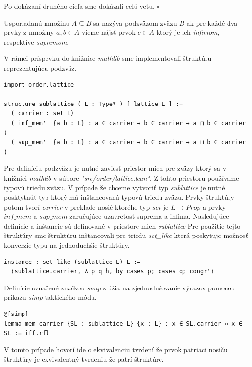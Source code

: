 \documentclass[a4paper,10pt,oneside]{report}%
\begin{document}
    Po dokázaní druhého cieľa sme dokázali celú vetu. $\square$

    Usporiadanú množinu $A \subseteq B$ sa nazýva podzväzom zväzu $B$ ak pre každé
dva prvky z množiny $a, b \in A$ vieme nájsť prvok $c \in A$ ktorý je ich \emph{infimom},
respektíve \emph{supremom}.

    V rámci príspevku do knižnice \emph{mathlib} sme implementovali štruktúru
reprezentujúcu podzväz.
\begin{lstlisting}
import order.lattice

structure sublattice ( L : Type* ) [ lattice L ] :=
  ( carrier : set L)
  ( inf_mem'  {a b : L} : a ∈ carrier → b ∈ carrier → a ⊓ b ∈ carrier )
  ( sup_mem'  {a b : L} : a ∈ carrier → b ∈ carrier → a ⊔ b ∈ carrier )
\end{lstlisting}
    Pre definíciu podzväzu je nutné zaviesť priestor mien pre zväzy ktorý sa v knižnici
\emph{mathlib} v súbore \emph{"src/order/lattice.lean"}.
    Z tohto priestoru používame typovú triedu zväzu.
    V prípade že chceme vytvoriť typ \emph{sublattice} je nutné posktytnúť
typ ktorý má inštancovanú typovú triedu zväzu.
    Prvky štruktúry potom tvorí \emph{carrier} v preklade nosič ktorého typ
$set$ je $L \to Prop$ a prvky $inf\_mem$ a $sup\_mem$ zaručujúce uzavretosť
    suprema a infima.
    Nasledujúce definície a inštancie sú definované v priestore mien \emph{sublattice}
    Pre použitie tejto štruktúry sme štruktúru inštancovali pre triedu \emph{set\_like}
ktorá poskytuje možnosť konverzie typu na jednoduchšie štruktúry.
\begin{lstlisting}
instance : set_like (sublattice L) L :=
  ⟨sublattice.carrier, λ p q h, by cases p; cases q; congr'⟩
\end{lstlisting}
    Definície označené značkou \emph{simp} slúžia na zjednodušovanie výrazov
pomocou príkazu \emph{simp} taktického módu.
\begin{lstlisting}
@[simp]
lemma mem_carrier {SL : sublattice L} {x : L} : x ∈ SL.carrier ↔ x ∈ SL := iff.rfl
\end{lstlisting}
    V tomto prípade hovorí ide o ekvivalenciu tvrdení že prvok patriaci nosiču
štruktúry je ekvivalentný tvrdeniu že patrí štruktúre.
\end{document}
